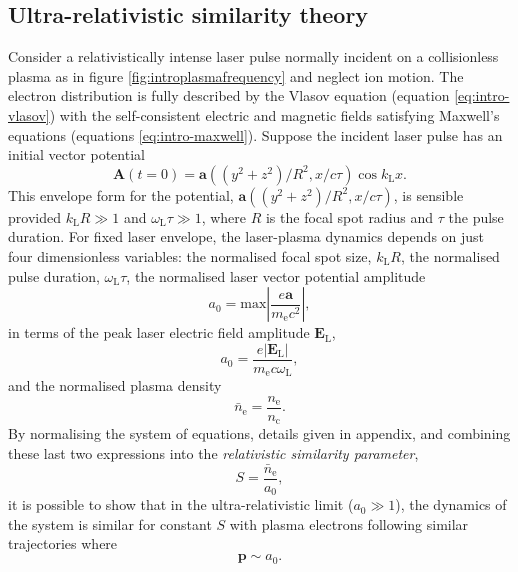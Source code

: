 \subsection{Ultra-relativistic similarity theory}
Consider a relativistically intense laser pulse normally incident on a collisionless plasma as in figure \ref{fig:introplasmafrequency} and neglect ion motion. The electron distribution is fully described by the Vlasov equation (equation \ref{eq:intro-vlasov}) with the self-consistent electric and magnetic fields satisfying Maxwell's equations (equations \ref{eq:intro-maxwell}). Suppose the incident laser pulse has an initial vector potential 
\begin{equation}
	\mathbf{A}(t=0) = \mathbf{a}((y^2+z^2)/R^2,x/c\tau)\cos k_\mathrm{L}x.
\end{equation}
This envelope form for the potential, $\mathbf{a}((y^2+z^2)/R^2,x/c\tau)$, is sensible provided $k_\mathrm{L}R \gg 1$ and $\omega_\mathrm{L}\tau \gg 1$, where $R$ is the focal spot radius and $\tau$ the pulse duration. For fixed laser envelope, the laser-plasma dynamics depends on just four dimensionless variables:  the normalised focal spot size, $k_\mathrm{L} R$, the normalised pulse duration, $\omega_\mathrm{L}\tau$, the normalised laser vector potential amplitude
\begin{equation}
	a_0 = \mathrm{max}\left|\frac{e \mathbf{a} }{m_\mathrm{e} c^2 }\right|,
\end{equation}
in terms of the peak laser electric field amplitude $\mathbf{E}_\mathrm{L}$,
\begin{equation}
	a_0 = \frac{e|\mathbf{E}_\mathrm{L}|}{m_\mathrm{e} c\omega_\mathrm{L}},
\end{equation}
and the normalised plasma density
\begin{equation}
	\bar{n}_\mathrm{e} = \frac{n_\mathrm{e}}{n_\mathrm{c}}.
\end{equation}
By normalising the system of equations, details given in appendix, and combining these last two expressions into the \textit{relativistic similarity parameter},
\begin{equation}
	S = \frac{\bar{n}_\mathrm{e}}{a_0},
\end{equation}
it is possible to show that in the ultra-relativistic limit ($a_0 \gg 1$), the dynamics of the system is similar for constant $S$ \cite{gordienkoScalingsUltrarelativisticLaser2005} with plasma electrons following similar trajectories where 
\begin{equation}\label{eq:intro-p_similarity}
	\mathbf{p} \sim a_0.
\end{equation}
